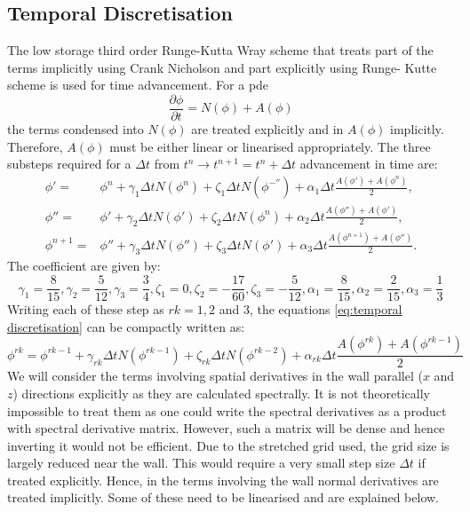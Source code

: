 \documentclass[preprint,12pt]{article}
\begin{document}
\subsection{Temporal Discretisation}
The low storage third order Runge-Kutta Wray scheme that treats part of the terms implicitly using Crank Nicholson and part explicitly using Runge- Kutte scheme is used for time advancement. For a pde
\begin{equation}
\frac{\partial \phi}{\partial t}=N(\phi)+A(\phi)
\end{equation}
the terms condensed into $N(\phi)$ are treated explicitly and in $A(\phi)$ implicitly. Therefore, $A(\phi)$ must be either linear or linearised appropriately. 
The three substeps required for a $\Delta t$ from $t^n\rightarrow t^{n+1}=t^n+\Delta t$ advancement in time are:
\begin{subequations}\label{eq:temporal discretisation}\begin{align}
\phi'=&\phi^n+\gamma_1 \Delta t N(\phi^n)+\zeta_1 \Delta t N(\phi^{-''})+\alpha_1\Delta t\frac{A(\phi')+A(\phi^n)}{2},\\
\phi''=&\phi'+\gamma_2 \Delta t N(\phi')+\zeta_2 \Delta t N(\phi^{n})+\alpha_2\Delta t\frac{A(\phi'')+A(\phi')}{2},\\
\phi^{n+1}=&\phi''+\gamma_3 \Delta t N(\phi'')+\zeta_3 \Delta t N(\phi')+\alpha_3\Delta t\frac{A(\phi^{n+1})+A(\phi'')}{2}.
\end{align}\end{subequations}
The coefficient are given by:
\begin{equation}
\gamma_1=\frac{8}{15}, \gamma_2=\frac{5}{12}, \gamma_3=\frac{3}{4}, \zeta_1=0, \zeta_2=-\frac{17}{60}, \zeta_3=-\frac{5}{12}, \alpha_1=\frac{8}{15}, \alpha_2=\frac{2}{15}, \alpha_3=\frac{1}{3}
\end{equation}
Writing each of these step as $rk=1,2$ and 3, the equations \eqref{eq:temporal discretisation} can be compactly written as:
\begin{equation}
\phi^{rk}=\phi^{rk-1}+\gamma_{rk}\Delta t N(\phi^{rk-1})+\zeta_{rk}\Delta t N(\phi^{rk-2})+\alpha_{rk}\Delta t\frac{A(\phi^{rk})+A(\phi^{rk-1})}{2}
\end{equation}
We will consider the terms involving spatial derivatives in the wall parallel ($x$ and $z$) directions explicitly as they are calculated spectrally. It is not theoretically impossible to treat them as one could write the spectral derivatives as a product with spectral derivative matrix. However, such a matrix will be dense and hence inverting it would not be efficient. Due to the stretched grid used, the grid size is largely reduced near the wall. This would require a very small step size $\Delta t$ if treated explicitly. Hence, in the terms involving the wall normal derivatives are treated implicitly. Some of these need to be linearised and are explained below.
\end{document}

